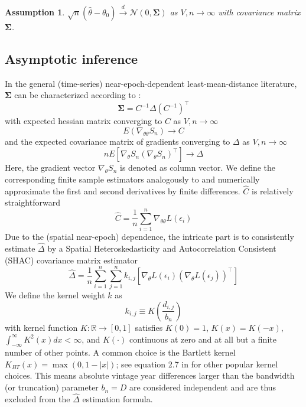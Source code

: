 \documentclass[12pt]{article}
\newtheorem{assume}{Assumption}
\begin{document}
\begin{assume}
	$\sqrt{n}(\hat{\theta} - \theta_0) \overset{d}{\to} \mathcal{N}(0,\mathbf{\Sigma})$ as $V,n \to \infty$ with covariance matrix $\mathbf{\Sigma}$.
\end{assume}

\subsection{Asymptotic inference}
\label{sec:asymptotic_inference}

In the general (time-series) near-epoch-dependent least-mean-distance literature, $\mathbf{\Sigma}$ can be characterized according to \citet[Theorem 11.2.b, Theorem H.1]{PP97}:
\[
\mathbf{\Sigma} = C^{-1} \Delta (C^{-1})^\top
\]
with expected hessian matrix converging to $C$ as $V,n \to \infty$
\[
E 
\left(
\nabla_{\theta \theta} S_n
\right)
\to C
\]
and the expected covariance matrix of gradients converging to $\Delta$ as $V,n \to \infty$
\[
n E 
\left[
\nabla_{\theta} S_n
(\nabla_{\theta} S_n)^\top
\right]
\to \Delta
\]
Here, the gradient vector $\nabla_{\theta} S_n$ is denoted as column vector.
We define the corresponding finite sample estimators analogously to \citet[Chapters 12, 13.1]{PP97} and numerically approximate the first and second derivatives by finite differences. $\hat{C}$ is relatively straightforward
\[
\hat{C} = \frac{1}{n} \sum_{i=1}^n \nabla_{\theta \theta} L \left( \epsilon_i \right)
\]
Due to the (spatial near-epoch) dependence, the intricate part is to consistently estimate $\hat{\Delta}$ by a Spatial Heteroskedasticity and Autocorrelation Consistent (SHAC) covariance matrix estimator \cite[equation 2]{KS11}
\[
\hat{\Delta} = \frac{1}{n} \sum_{i=1}^n \sum_{j=1}^n
k_{i,j}
\left[
\nabla_{\theta} L \left( \epsilon_i \right)
\left(
\nabla_{\theta} L \left( \epsilon_j \right)
\right)^\top
\right]
\]
We define the kernel weight $k$ as
\[
k_{i,j} \equiv K \left( \frac{d_{i,j}}{b_n} \right)
\]
with kernel function $K: \mathbb{R} \to [0,1]$ satisfies $K(0)=1$, $K(x)=K(-x)$, $\int_{-\infty}^{\infty} K^2(x) dx < \infty$, and $K(\cdot)$ continuous at zero and at all but a finite number of other points.
A common choice is the Bartlett kernel $K_{BT}(x)= \max(0, 1-|x|)$; see equation 2.7 in \cite{A91} for other popular kernel choices.
This means absolute vintage year differences larger than the bandwidth (or truncation) parameter $b_n=D$ are considered independent and are thus excluded from the $\hat{\Delta}$ estimation formula.
\end{document}
